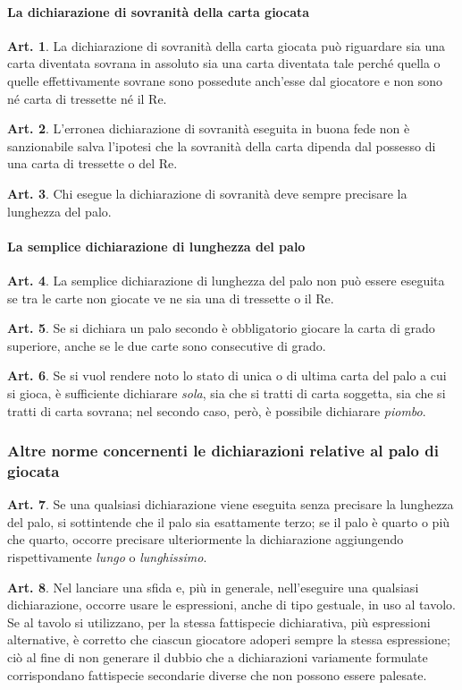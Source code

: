 \documentclass[italian,a4paper]{book}
\theoremstyle{definition}
\newtheorem{art}{Art.}
\begin{document}
\paragraph{La dichiarazione di sovranità della carta giocata}
\begin{art}
    La dichiarazione di sovranità della carta giocata può riguardare sia una carta diventata sovrana in assoluto sia una carta diventata tale perché quella o quelle effettivamente sovrane sono possedute anch'esse dal giocatore e non sono né carta di tressette né il Re.
\end{art}
\begin{art}
    L'erronea dichiarazione di sovranità eseguita in buona fede non è sanzionabile salva l'ipotesi che la sovranità della carta dipenda dal possesso di una carta di tressette o del Re.
\end{art}
\begin{art}
    Chi esegue la dichiarazione di sovranità deve sempre precisare la lunghezza del palo.
\end{art}
\paragraph{La semplice dichiarazione di lunghezza del palo}
\begin{art}
    La semplice dichiarazione di lunghezza del palo non può essere eseguita se tra le carte non giocate ve ne sia una di tressette o il Re.
\end{art}
\begin{art}
    Se si dichiara un palo secondo è obbligatorio giocare la carta di grado superiore, anche se le due carte sono consecutive di grado.
\end{art}
\begin{art}
    Se si vuol rendere noto lo stato di unica o di ultima carta del palo a cui si gioca,  è sufficiente dichiarare \emph{sola}, sia che si tratti di carta soggetta, sia che si tratti di carta sovrana; nel secondo caso, però, è possibile dichiarare \emph{piombo}.
\end{art}
\subsubsection{Altre norme concernenti le dichiarazioni relative al palo di
giocata}
\begin{art}
    Se una qualsiasi dichiarazione viene eseguita senza precisare la lunghezza del palo, si sottintende che il palo sia esattamente terzo; se il palo è quarto o più che quarto, occorre precisare ulteriormente la dichiarazione aggiungendo rispettivamente \emph{lungo} o  \emph{lunghissimo}.
\end{art}
\begin{art}
    Nel lanciare una sfida e, più in generale, nell'eseguire una qualsiasi dichiarazione, occorre usare le espressioni, anche di tipo gestuale, in uso al tavolo.
    Se al tavolo si utilizzano, per la stessa fattispecie dichiarativa, più espressioni alternative, è corretto che ciascun giocatore adoperi sempre la stessa espressione; ciò al fine di non generare il dubbio che a dichiarazioni variamente formulate corrispondano fattispecie secondarie diverse che non possono essere palesate.
\end{art}
\end{document}
